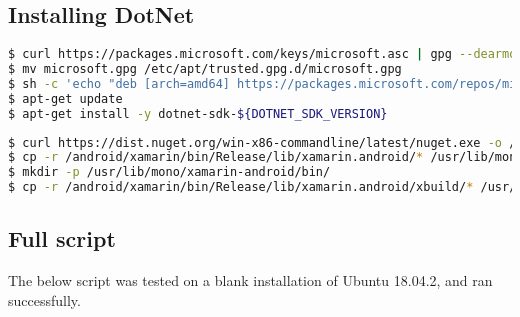 \subsection{Installing DotNet}

\begin{lstlisting}[language=bash]
$ curl https://packages.microsoft.com/keys/microsoft.asc | gpg --dearmor > microsoft.gpg
$ mv microsoft.gpg /etc/apt/trusted.gpg.d/microsoft.gpg
$ sh -c 'echo "deb [arch=amd64] https://packages.microsoft.com/repos/microsoft-ubuntu-bionic-prod bionic main" > /etc/apt/sources.list.d/dotnetdev.list'
$ apt-get update
$ apt-get install -y dotnet-sdk-${DOTNET_SDK_VERSION}
\end{lstlisting}

\begin{lstlisting}[language=bash]
$ curl https://dist.nuget.org/win-x86-commandline/latest/nuget.exe -o /nuget.exe
$ cp -r /android/xamarin/bin/Release/lib/xamarin.android/* /usr/lib/mono/
$ mkdir -p /usr/lib/mono/xamarin-android/bin/
$ cp -r /android/xamarin/bin/Release/lib/xamarin.android/xbuild/* /usr/share/dotnet/sdk/${DOTNET_SDK_VERSION}
\end{lstlisting}

\subsection{Full script}

The below script was tested on a blank installation of Ubuntu 18.04.2,
and ran successfully.

